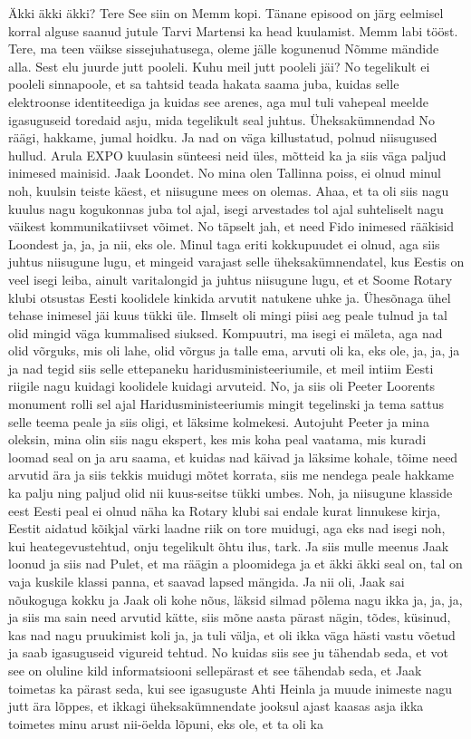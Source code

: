 
Äkki äkki äkki?
Tere See siin on Memm kopi. Tänane episood on järg eelmisel korral alguse saanud jutule Tarvi Martensi ka head kuulamist. Memm labi tööst. Tere, ma teen väikse sissejuhatusega, oleme jälle kogunenud Nõmme mändide alla. Sest elu juurde jutt pooleli. Kuhu meil jutt pooleli jäi?
No tegelikult ei pooleli sinnapoole, et sa tahtsid teada hakata saama juba, kuidas selle elektroonse identiteediga ja kuidas see arenes, aga mul tuli vahepeal meelde igasuguseid toredaid asju, mida tegelikult seal juhtus. Üheksakümnendad No räägi, hakkame, jumal hoidku. Ja nad on väga killustatud, polnud niisugused hullud. Arula EXPO kuulasin sünteesi neid üles, mõtteid ka ja siis väga paljud inimesed mainisid. Jaak Loondet. No mina olen Tallinna poiss, ei olnud minul noh, kuulsin teiste käest, et niisugune mees on olemas. Ahaa, et ta oli siis nagu kuulus nagu kogukonnas juba tol ajal, isegi arvestades tol ajal suhteliselt nagu väikest kommunikatiivset võimet. No täpselt jah, et need Fido inimesed rääkisid Loondest ja, ja, ja nii, eks ole. Minul taga eriti kokkupuudet ei olnud, aga siis juhtus niisugune lugu, et mingeid varajast selle üheksakümnendatel, kus Eestis on veel isegi leiba, ainult varitalongid ja juhtus niisugune lugu, et et Soome Rotary klubi otsustas Eesti koolidele kinkida arvutit natukene uhke ja. Ühesõnaga ühel tehase inimesel jäi kuus tükki üle. Ilmselt oli mingi piisi aeg peale tulnud ja tal olid mingid väga kummalised siuksed. Kompuutri, ma isegi ei mäleta, aga nad olid võrguks, mis oli lahe, olid võrgus ja talle ema, arvuti oli ka, eks ole, ja, ja, ja ja nad tegid siis selle ettepaneku haridusministeeriumile, et meil intiim Eesti riigile nagu kuidagi koolidele kuidagi arvuteid. No, ja siis oli Peeter Loorents monument rolli sel ajal Haridusministeeriumis mingit tegelinski ja tema sattus selle teema peale ja siis oligi, et läksime kolmekesi. Autojuht Peeter ja mina oleksin, mina olin siis nagu ekspert, kes mis koha peal vaatama, mis kuradi loomad seal on ja aru saama, et kuidas nad käivad ja läksime kohale, tõime need arvutid ära ja siis tekkis muidugi mõtet korrata, siis me nendega peale hakkame ka palju ning paljud olid nii kuus-seitse tükki umbes. Noh, ja niisugune klasside eest Eesti peal ei olnud näha ka Rotary klubi sai endale kurat linnukese kirja, Eestit aidatud kõikjal värki laadne riik on tore muidugi, aga eks nad isegi noh, kui heategevustehtud, onju tegelikult õhtu ilus, tark. Ja siis mulle meenus Jaak loonud ja siis nad Pulet, et ma räägin a ploomidega ja et äkki äkki seal on, tal on vaja kuskile klassi panna, et saavad lapsed mängida. Ja nii oli, Jaak sai nõukoguga kokku ja Jaak oli kohe nõus, läksid silmad põlema nagu ikka ja, ja, ja, ja siis ma sain need arvutid kätte, siis mõne aasta pärast nägin, tõdes, küsinud, kas nad nagu pruukimist koli ja, ja tuli välja, et oli ikka väga hästi vastu võetud ja saab igasuguseid vigureid tehtud. No kuidas siis see ju tähendab seda, et vot see on oluline kild informatsiooni sellepärast et see tähendab seda, et Jaak toimetas ka pärast seda, kui see igasuguste Ahti Heinla ja muude inimeste nagu jutt ära lõppes, et ikkagi üheksakümnendate jooksul ajast kaasas asja ikka toimetes minu arust nii-öelda lõpuni, eks ole, et ta oli ka 